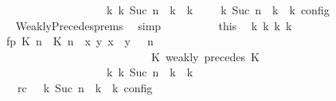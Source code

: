 \begin{isabellebody}
\ \ \ \ \ \ \ \ \ \ \ \ \ \ \ \ \ \ \ \ \ \ \ \ \ \ \ \ \ {\isasymhookrightarrow}\isactrlbsup k\isactrlesup \ {\isacharparenleft}{\isasymGamma}\isactrlsub k{\isacharcomma}\ Suc\ n\ {\isasymturnstile}\ {\isasymPsi}\isactrlsub k\ {\isasymtriangleright}\ {\isasymPhi}\isactrlsub k{\isacharparenright}{\isacharparenright}\ {\isasymand}\ {\isacharparenleft}{\isasymrho}\ {\isasymin}\ {\isasymlbrakk}\ {\isasymGamma}\isactrlsub k{\isacharcomma}\ Suc\ n\ {\isasymturnstile}\ {\isasymPsi}\isactrlsub k\ {\isasymtriangleright}\ {\isasymPhi}\isactrlsub k\ {\isasymrbrakk}\isactrlsub c\isactrlsub o\isactrlsub n\isactrlsub f\isactrlsub i\isactrlsub g{\isacharparenright}{\isacartoucheclose}\isanewline
\ \ \ \ \ \ \ \ \ \ \isamarkupfalse%
\ \ WeaklyPrecedes{\isachardot}prems\ \isamarkupfalse%
\ simp\isanewline
\ \ \ \ \ \ \ \ \isamarkupfalse%
\ this\ \isamarkupfalse%
\ {\isasymGamma}\isactrlsub k\ {\isasymPsi}\isactrlsub k\ {\isasymPhi}\isactrlsub k\ k\isanewline
\ \ \ \ \ \ \ \ \ \ \ fp{\isacharcolon}{\isacartoucheopen}{\isacharparenleft}{\isacharparenleft}{\isacharparenleft}{\isasymlceil}{\isacharhash}\isactrlsup {\isasymle}\ K\ n{\isacharcomma}\ {\isacharhash}\isactrlsup {\isasymle}\ K\ n{\isasymrceil}\ {\isasymin}\ {\isacharparenleft}{\isasymlambda}{\isacharparenleft}x{\isacharcomma}\ y{\isacharparenright}{\isachardot}\ x\ {\isasymle}\ y{\isacharparenright}{\isacharparenright}\ {\isacharhash}\ {\isasymGamma}{\isacharparenright}{\isacharcomma}\ n\isanewline
\ \ \ \ \ \ \ \ \ \ \ \ \ \ \ \ \ \ \ \ \ \ \ \ \ \ \ \ \ \ \ \ \ \ {\isasymturnstile}\ {\isasymPsi}\ {\isasymtriangleright}\ {\isacharparenleft}{\isacharparenleft}K\ weakly\ precedes\ K\ {\isacharhash}\ {\isasymPhi}{\isacharparenright}{\isacharparenright}\isanewline
\ \ \ \ \ \ \ \ \ \ \ \ \ \ \ \ \ \ \ \ \ \ \ \ \ \ \ \ \ {\isasymhookrightarrow}\isactrlbsup k\isactrlesup \ {\isacharparenleft}{\isasymGamma}\isactrlsub k{\isacharcomma}\ Suc\ n\ {\isasymturnstile}\ {\isasymPsi}\isactrlsub k\ {\isasymtriangleright}\ {\isasymPhi}\isactrlsub k{\isacharparenright}{\isacartoucheclose}\isanewline
\ \ \ \ \ \ \ \ \ \ \ \ \ rc{\isacharcolon}{\isacartoucheopen}{\isasymrho}\ {\isasymin}\ {\isasymlbrakk}\ {\isasymGamma}\isactrlsub k{\isacharcomma}\ Suc\ n\ {\isasymturnstile}\ {\isasymPsi}\isactrlsub k\ {\isasymtriangleright}\ {\isasymPhi}\isactrlsub k\ {\isasymrbrakk}\isactrlsub c\isactrlsub o\isactrlsub n\isactrlsub f\isactrlsub i\isactrlsub g{\isacartoucheclose}\ \isamarkupfalse%

\end{isabellebody}
